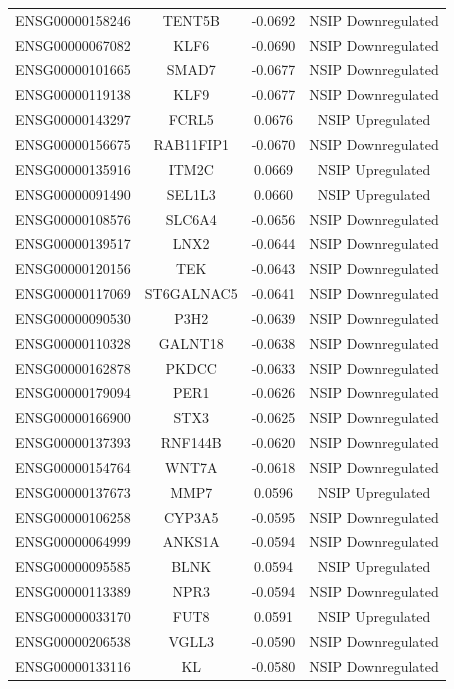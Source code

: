 \documentclass[
]{article}
\begin{document}
\begin{singlespace}
\begin{longtable}[t]{lccc}
ENSG00000158246 & TENT5B & -0.0692 & NSIP Downregulated\\
ENSG00000067082 & KLF6 & -0.0690 & NSIP Downregulated\\
ENSG00000101665 & SMAD7 & -0.0677 & NSIP Downregulated\\
\addlinespace
ENSG00000119138 & KLF9 & -0.0677 & NSIP Downregulated\\
ENSG00000143297 & FCRL5 & 0.0676 & NSIP Upregulated\\
ENSG00000156675 & RAB11FIP1 & -0.0670 & NSIP Downregulated\\
ENSG00000135916 & ITM2C & 0.0669 & NSIP Upregulated\\
ENSG00000091490 & SEL1L3 & 0.0660 & NSIP Upregulated\\
\addlinespace
ENSG00000108576 & SLC6A4 & -0.0656 & NSIP Downregulated\\
ENSG00000139517 & LNX2 & -0.0644 & NSIP Downregulated\\
ENSG00000120156 & TEK & -0.0643 & NSIP Downregulated\\
ENSG00000117069 & ST6GALNAC5 & -0.0641 & NSIP Downregulated\\
ENSG00000090530 & P3H2 & -0.0639 & NSIP Downregulated\\
\addlinespace
ENSG00000110328 & GALNT18 & -0.0638 & NSIP Downregulated\\
ENSG00000162878 & PKDCC & -0.0633 & NSIP Downregulated\\
ENSG00000179094 & PER1 & -0.0626 & NSIP Downregulated\\
ENSG00000166900 & STX3 & -0.0625 & NSIP Downregulated\\
ENSG00000137393 & RNF144B & -0.0620 & NSIP Downregulated\\
\addlinespace
ENSG00000154764 & WNT7A & -0.0618 & NSIP Downregulated\\
ENSG00000137673 & MMP7 & 0.0596 & NSIP Upregulated\\
ENSG00000106258 & CYP3A5 & -0.0595 & NSIP Downregulated\\
ENSG00000064999 & ANKS1A & -0.0594 & NSIP Downregulated\\
ENSG00000095585 & BLNK & 0.0594 & NSIP Upregulated\\
\addlinespace
ENSG00000113389 & NPR3 & -0.0594 & NSIP Downregulated\\
ENSG00000033170 & FUT8 & 0.0591 & NSIP Upregulated\\
ENSG00000206538 & VGLL3 & -0.0590 & NSIP Downregulated\\
ENSG00000133116 & KL & -0.0580 & NSIP Downregulated\\

\end{longtable}
\end{singlespace}
\end{document}
